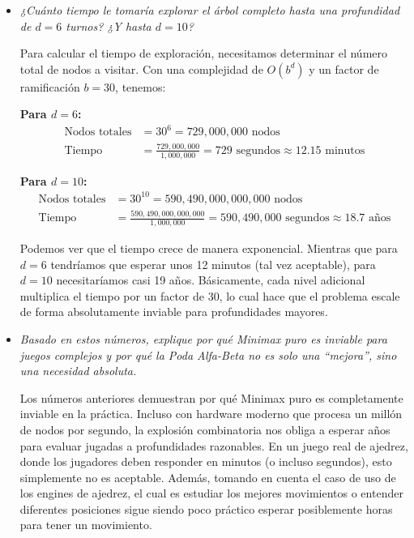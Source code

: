 \documentclass[11pt]{article}
\begin{document}
\begin{itemize}[leftmargin=*, itemsep=0.8em]

	\item \textit{¿Cuánto tiempo le tomaría explorar el árbol completo hasta una profundidad de $d = 6$ turnos?
		      ¿Y hasta $d = 10$?}

	      Para calcular el tiempo de exploración, necesitamos determinar el número total de nodos a visitar. Con una
	      complejidad de $O(b^d)$ y un factor de ramificación $b=30$, tenemos:

	      \textbf{Para $d = 6$:}
	      \begin{align*}
		      \text{Nodos totales} & = 30^6 = 729,000,000 \text{ nodos}                                                   \\
		      \text{Tiempo}        & = \frac{729,000,000}{1,000,000} = 729 \text{ segundos} \approx 12.15 \text{ minutos}
	      \end{align*}

	      \textbf{Para $d = 10$:}
	      \begin{align*}
		      \text{Nodos totales} & = 30^{10} = 590,490,000,000,000 \text{ nodos}                                                    \\
		      \text{Tiempo}        & = \frac{590,490,000,000,000}{1,000,000} = 590,490,000 \text{ segundos} \approx 18.7 \text{ años}
	      \end{align*}

	      Podemos ver que el tiempo crece de manera exponencial. Mientras que para $d=6$ tendríamos que esperar
	      unos 12 minutos (tal vez aceptable), para $d=10$ necesitaríamos casi 19 años. Básicamente, cada nivel adicional
	      multiplica el tiempo por un factor de 30, lo cual hace que el problema escale de forma absolutamente inviable
	      para profundidades mayores.

	\item \textit{Basado en estos números, explique por qué Minimax puro es inviable para juegos complejos y por
		      qué la Poda Alfa-Beta no es solo una ``mejora'', sino una necesidad absoluta.}

	      Los números anteriores demuestran por qué Minimax puro es completamente inviable en la práctica.
	      Incluso con hardware moderno que procesa un millón de nodos por segundo, la explosión combinatoria nos obliga
	      a esperar años para evaluar jugadas a profundidades razonables. En un juego real de ajedrez, donde los jugadores
	      deben responder en minutos (o incluso segundos), esto simplemente no es aceptable. Además, tomando en cuenta el caso
	      de uso de los engines de ajedrez, el cual es estudiar los mejores movimientos o entender diferentes posiciones sigue
	      siendo poco práctico esperar posiblemente horas para tener un movimiento.


\end{itemize}
\end{document}
